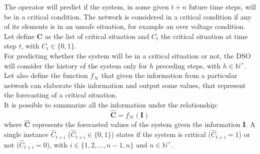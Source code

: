 The operator will predict if the system, in some given $t+n$ future time steps, will be in a critical condition. The network is considered in a critical condition if any of its elements is in an unsafe situation, for example an over voltage condition. Let define $\textbf{C}$ as the list of critical situation and $C_t$ the critical situation at time step $t$, with $C_t \in \{0,1\}$.  \\
For predicting whether the system will be in a critical situation or not, the \gls{DSO} will consider the history of the system only for $h$ preceding steps, with $h \in \mathbb{N}^+$. \\

Let also define the function $f_\mathcal{N}$ that given the information from a particular network can elaborate this information and output some values, that represent the forecasting of a critical situation. \\
It is possible to summarize all the information under the relationship:
\begin{equation} \label{eq:fmapping}
    \hat{\textbf{C}} = f_\mathcal{N}(\textbf{I})
\end{equation}
\noindent where $\hat{\textbf{C}}$ represents the forecasted values of the system given the information $\textbf{I}$. A single instance $\hat{C}_{t+i}$ ($\hat{C}_{t+i} \in \{0,1\}$) states if the system is critical ($\hat{C}_{t+i}=1$) or not ($\hat{C}_{t+i}=0$), with $i \in \{1,2,\dots,n-1,n\}$ and $n \in \mathbb{N}^+$. \\

    
    
    

